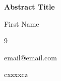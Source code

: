\documentclass[12pt, twoside, a4paper, hidelinks]{article}
\begin{document}
    \begin{center} {\large \textbf{Abstract Title}} \end{center}
    \begin{center} First Name \end{center}

    \begin{center} 9
        
        email@email.com
    \end{center}

    cxzxxcz
    
    
\end{document}

